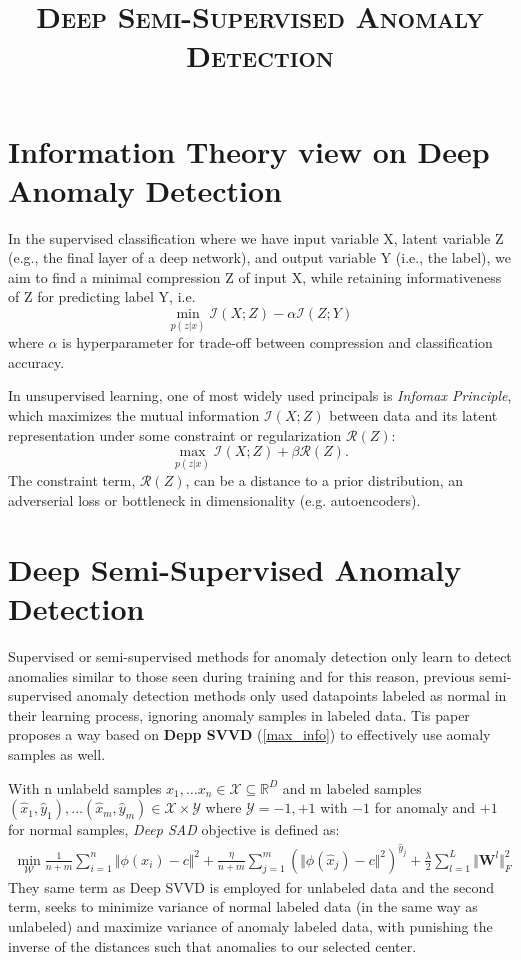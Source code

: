 \documentclass[a4]{article}
\title{\textsc{Deep Semi-Supervised Anomaly Detection}}
\author{}
\newcommand{\information}{\mathcal{I}}
\begin{document}
\maketitle
\section{Information Theory view on Deep Anomaly Detection}
In the supervised classification where we have input variable X, latent variable Z (e.g., the final layer of a deep network), and output variable Y (i.e., the label), we aim to find a minimal compression Z of input X, while retaining informativeness of Z for predicting label Y, i.e.
\begin{equation}
\min_{p(z|x)} \information(X; Z) - \alpha \information(Z; Y)
\end{equation}
where $\alpha$ is hyperparameter for trade-off between compression and classification accuracy.

In unsupervised learning, one of most widely used principals is \textit{Infomax Principle}, which maximizes the mutual information $\information(X; Z)$ between data and its latent representation under some constraint or regularization $\mathcal{R}(Z)$:
\begin{equation}
	\max_{p(z|x)} \information(X; Z) + \beta \mathcal{R}(Z).
	\label{max_info}
\end{equation}
The constraint term, $\mathcal{R}(Z)$, 	can be a distance to a prior distribution, an adverserial loss or bottleneck in dimensionality (e.g. autoencoders).

\section{Deep Semi-Supervised Anomaly Detection}
Supervised or semi-supervised methods for anomaly detection only learn to detect anomalies similar to those seen during training and for this reason, previous semi-supervised anomaly detection methods only used datapoints labeled as normal in their learning process, ignoring anomaly samples in labeled data. Tis paper proposes a way based on \textbf{Depp SVVD} (\ref{max_info}) to effectively use aomaly samples as well.

With n unlabeld samples $x_1, \ldots x_n \in \mathcal{X} \subseteq \mathbb{R}^D$ and m labeled samples $(\hat{x}_1, \hat{y}_1), \ldots (\hat{x}_m, \hat{y}_m) \in \mathcal{X} \times \mathcal{Y}$ where $\mathcal{Y} = {-1, +1}$ with $-1$ for anomaly and $+1$ for normal samples, \textit{Deep SAD} objective is defined as:
\begin{equation}
	\begin{split}
		\min_{\mathcal{W}} \frac{1}{n+m}\sum_{i=1}^{n} \Vert\phi(x_i) - c\Vert ^2 + \frac{\eta}{n+m}\sum_{j=1}^{m} \left(\Vert\phi(\hat{x}_j) - c\Vert ^2\right)^{\hat{y}_j} + \frac{\lambda}{2}\sum_{l=1}^{L}\Vert \mathbf{W}^l\Vert^2_F
	\end{split}
\end{equation}
They same term as Deep SVVD is employed for unlabeled data and the second term, seeks to minimize variance of normal labeled data (in the same way as unlabeled) and maximize variance of anomaly labeled data, with punishing the inverse of the distances such that anomalies to our selected center.
\end{document}
